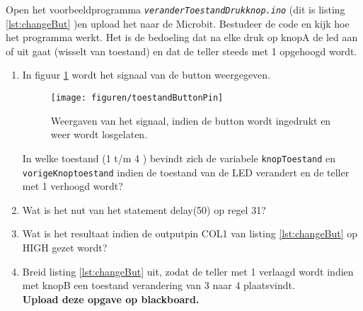 Open het voorbeeldprogramma \texttt{\textit{veranderToestandDrukknop.ino}} (dit is listing \ref{lst:changeBut} )en upload het naar de Microbit.
Bestudeer de code en kijk hoe het programma werkt. Het is de bedoeling dat na elke druk op knopA de led aan of uit gaat (wisselt van toestand) en dat de teller steeds met 1 opgehoogd wordt. 
\begin{enumerate}[label=(\Alph*)]
	
	\item In figuur \ref{fig:swToestand} wordt het signaal van de button weergegeven.
	\begin{figure}[h!]
		\captionsetup{justification=centering}
		\texttt{[image: figuren/toestandButtonPin]}
		\centering
		\caption{Weergaven van het signaal, indien de button wordt ingedrukt en weer wordt losgelaten.}
		\label{fig:swToestand}
	\end{figure}
	In welke toestand (1 t/m 4 )  bevindt zich de variabele \texttt{knopToestand} en \texttt{vorigeKnoptoestand} indien de toestand van de LED verandert en de teller met 1 verhoogd wordt?
	\item Wat is het nut van het statement \textcolor{arduinoOrange}{delay}(50) op regel 31?\hrulefill
	\item Wat is het resultaat indien de outputpin COL1 van listing \ref{lst:changeBut} op \textcolor{arduinoBlue}{HIGH} gezet wordt?	
	\item Breid listing \ref{lst:changeBut} uit, zodat de teller met 1 verlaagd wordt indien met knopB een toestand verandering van 3 naar 4 plaatsvindt.\\
	\textbf{Upload deze opgave op blackboard.}
	
\end{enumerate}

